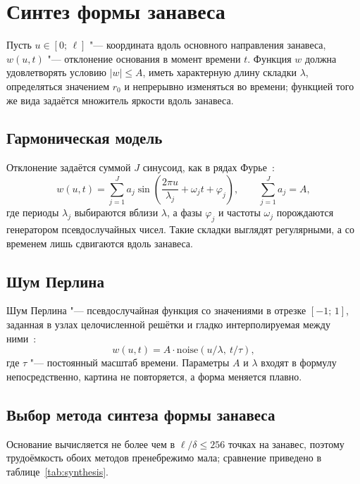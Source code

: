 \section{Синтез формы занавеса}

Пусть $u \in [0;\, \ell]$ "--- координата вдоль основного направления занавеса, $w(u, t)$ "--- отклонение основания в момент времени $t$. Функция $w$ должна удовлетворять условию $|w| \leqslant A$, иметь характерную длину складки $\lambda$, определяться значением $r_0$ и непрерывно изменяться во времени; функцией того же вида задаётся множитель яркости вдоль занавеса.

\subsection{Гармоническая модель}

Отклонение задаётся суммой $J$ синусоид, как в рядах Фурье~\cite[с.~250]{gonzalez2012}:
\begin{equation}
	w(u, t) = \sum_{j=1}^{J} a_j \sin\left( \frac{2\pi u}{\lambda_j} + \omega_j t + \varphi_j \right), \qquad \sum_{j=1}^{J} a_j = A,
	\label{eq:harmonic}
\end{equation}
где периоды $\lambda_j$ выбираются вблизи $\lambda$, а фазы $\varphi_j$ и частоты $\omega_j$ порождаются генератором псевдослучайных чисел. Такие складки выглядят регулярными, а со временем лишь сдвигаются вдоль занавеса.

\subsection{Шум Перлина}

Шум Перлина "--- псевдослучайная функция со значениями в отрезке $[-1;\, 1]$, заданная в узлах целочисленной решётки и гладко интерполируемая между ними~\cite{hill2002}:
\begin{equation}
	w(u, t) = A \cdot \mathrm{noise}\left( u / \lambda,\ t / \tau \right),
	\label{eq:perlin}
\end{equation}
где $\tau$ "--- постоянный масштаб времени. Параметры $A$ и $\lambda$ входят в формулу непосредственно, картина не повторяется, а форма меняется плавно.

\subsection{Выбор метода синтеза формы занавеса}

Основание вычисляется не более чем в $\ell / \delta \leqslant 256$ точках на занавес, поэтому трудоёмкость обоих методов пренебрежимо мала; сравнение приведено в таблице~\ref{tab:synthesis}.

